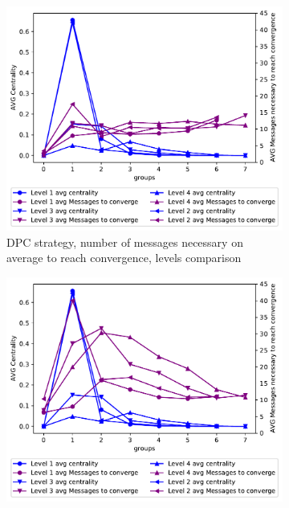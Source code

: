 \begin{figure}[h]
     \centering
     \begin{subfigure}[b]{0.49\textwidth}
         \centering
         \includegraphics[width=\textwidth]{images/hierarchy/dpc_all_levels_comparison_centVSmsg.pdf}
		 \caption{\ac{DPC} strategy, number of messages necessary on
			average to reach convergence, levels comparison}
         \label{fig:different_levels_comparison_dpc_msg}
     \end{subfigure}
	 \hfill
     \begin{subfigure}[b]{0.49\textwidth}
         \centering
         \includegraphics[width=\textwidth]{images/hierarchy/reverse_dpc_all_levels_comparison_centVSmsg.pdf}

\end{subfigure}
\end{figure}
